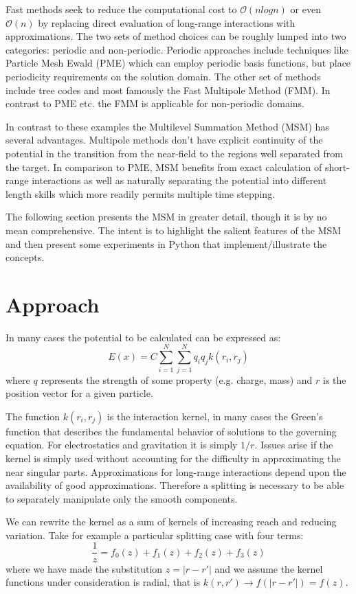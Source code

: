 \documentclass[review]{siamart}
\newcommand{\be}{\begin{equation}}
\newcommand{\ee}{\end{equation}}
\begin{document}
Fast methods seek to reduce the computational cost to  $\mathcal{O}(n log n)$ or even  $\mathcal{O}(n)$ by replacing direct evaluation of long-range interactions with approximations. The two sets of method choices can be roughly lumped into two categories: periodic and non-periodic. Periodic approaches include techniques like Particle Mesh Ewald (PME) which can employ periodic basis functions, but place periodicity requirements on the solution domain. The other set of methods include tree codes and most famously the Fast Multipole Method (FMM). In contrast to PME etc. the FMM is applicable for non-periodic domains.

In contrast to these examples the Multilevel Summation Method (MSM) has several advantages. Multipole methods don't have explicit continuity of the potential  in the transition from the near-field to the regions well separated from the target. In comparison to PME, MSM benefits from exact calculation of short-range interactions as well as naturally separating the potential into different length skills which more readily permits multiple time stepping.\cite{2}

The following section presents the MSM in greater detail, though it is by no mean comprehensive. The intent is to highlight the salient features of the MSM and then present some experiments in Python that implement/illustrate the concepts.

\section{Approach}\label{sec:main}
In many cases the potential to be calculated can be expressed as:
\be E(x) = C \sum_{i=1}^N \sum_{j=1}^N q_i q_j k(r_i,r_j)\ee
where $q$ represents the strength of some property (e.g. charge, mass) and $r$ is the position vector for a given particle.

The function $k(r_i, r_j)$ is the interaction kernel, in many cases the Green's function that describes the fundamental behavior of solutions to the governing equation. For electrostatics and gravitation it is simply $1/r$. Issues arise if the kernel is simply used without accounting for the difficulty in approximating the near singular parts. Approximations for long-range interactions depend upon the availability of good approximations. Therefore a splitting is necessary to be able to separately manipulate only the smooth components.

We can rewrite the kernel as a sum of kernels of increasing reach and reducing variation. Take for example a particular splitting case\cite{3} with four terms:
\be \frac{1}{z} = f_0(z)+f_1(z)+f_2(z)+f_3(z) \ee
where we have made the substitution $z = |r-r'|$ and we assume the kernel functions under consideration is radial, that is $k(r,r') \rightarrow f(|r-r'|)=f(z)$.
\end{document}
